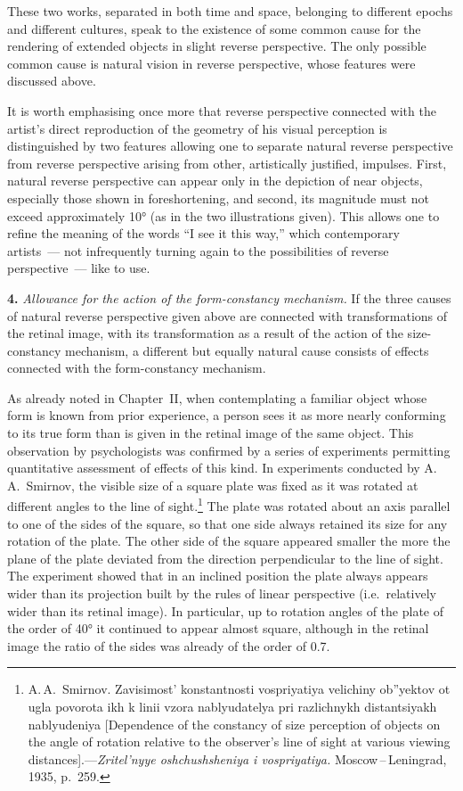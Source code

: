 
These two works, separated in both time and space, belonging to different epochs and
different cultures, speak to the existence of some common cause for the rendering of
extended objects in slight reverse perspective.  The only possible common cause is
natural vision in reverse perspective, whose features were discussed above.

It is worth emphasising once more that reverse perspective connected with the
artist's direct reproduction of the geometry of his visual perception is
distinguished by two features allowing one to separate natural reverse perspective
from reverse perspective arising from other, artistically justified, impulses.
First, natural reverse perspective can appear only in the depiction of near objects,
especially those shown in foreshortening, and second, its magnitude must not exceed
approximately 10° (as in the two illustrations given).  This allows one to refine the
meaning of the words ``I see it this way,'' which contemporary artists~--- not
infrequently turning again to the possibilities of reverse perspective~--- like to
use.

\medskip
\noindent\textbf{4.}\quad
\emph{Allowance for the action of the form-constancy mechanism.}  If the three causes
of natural reverse perspective given above are connected with transformations of the
retinal image, with its transformation as a result of the action of the
size-constancy mechanism, a different but equally natural cause consists of effects
connected with the form-constancy mechanism.

As already noted in Chapter~II, when contemplating a familiar object whose form is
known from prior experience, a person sees it as more nearly conforming to its true
form than is given in the retinal image of the same object.  This observation by
psychologists was confirmed by a series of experiments permitting quantitative
assessment of effects of this kind.  In experiments conducted by A.\,A.~Smirnov, the
visible size of a square plate was fixed as it was rotated at different angles to the
line of sight.\footnote{A.\,A.~Smirnov.  Zavisimost' konstantnosti vospriyatiya
  velichiny ob''yektov ot ugla povorota ikh k linii vzora nablyudatelya pri
  razlichnykh distantsiyakh nablyudeniya [Dependence of the constancy of size
  perception of objects on the angle of rotation relative to the observer's line of
  sight at various viewing distances].---\emph{Zritel'nyye oshchushsheniya i
  vospriyatiya.}  Moscow\,--\,Leningrad, 1935, p.~259.}
The plate was rotated about an axis parallel to one of the sides of the square, so
that one side always retained its size for any rotation of the plate.  The other side
of the square appeared smaller the more the plane of the plate deviated from the
direction perpendicular to the line of sight.  The experiment showed that in an
inclined position the plate always appears wider than its projection built by the
rules of linear perspective (i.e.\ relatively wider than its retinal image).  In
particular, up to rotation angles of the plate of the order of 40° it continued to
appear almost square, although in the retinal image the ratio of the sides was
already of the order of 0.7.

